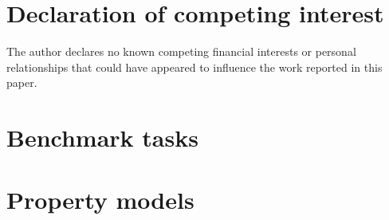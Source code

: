 \documentclass[preprint,12pt]{elsarticle}
\begin{document}
\section*{Declaration of competing interest}
The author declares no known competing financial interests or personal relationships that could have appeared to influence the work reported in this paper.




\appendix
\section{Benchmark tasks}
\begin{table}[h]
\centering\scriptsize
\caption{Benchmark tasks with abridged prompts. The checks column counts assertions on recorded tool arguments and identifies additional criteria.}
\resizebox{\textwidth}{!}{}
\end{table}

\section{Property models}
\begin{table}[h]
\centering\scriptsize
\caption{All property models with paper-grouped cross-validation quality ($R^2$ in log space, Spearman rank correlation, 80\,\% interval coverage) and training size.}
\resizebox{\textwidth}{!}{}
\end{table}
\end{document}

